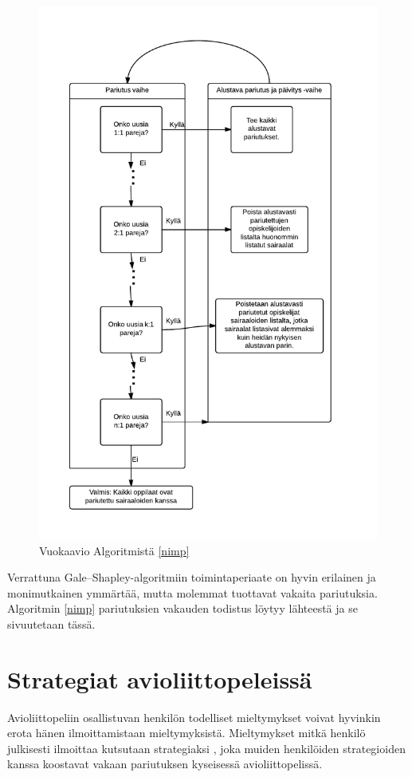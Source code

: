 \documentclass[finnish]{tktltiki2}
\theoremstyle{definition}
\theoremstyle{remark}
\begin{document}
\begin{figure}[t!]
\includegraphics[scale=0.8]{NIMP}
\caption{Vuokaavio Algoritmistä \ref{nimp} \cite{roth84}}
\label{nimp-vuo}
\end{figure}
Verrattuna Gale--Shapley-algoritmiin toimintaperiaate on hyvin erilainen ja monimutkainen ymmärtää, mutta molemmat tuottavat vakaita pariutuksia. Algoritmin \ref{nimp} pariutuksien vakauden todistus löytyy lähteestä ja se sivuutetaan tässä.

\section{Strategiat avioliittopeleissä}
Avioliittopeliin osallistuvan henkilön todelliset mieltymykset voivat hyvinkin erota hänen ilmoittamistaan mieltymyksistä. Mieltymykset mitkä henkilö julkisesti ilmoittaa kutsutaan strategiaksi \cite{Balinski}, joka muiden henkilöiden strategioiden kanssa koostavat vakaan pariutuksen kyseisessä avioliittopelissä.
\end{document}

